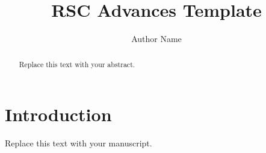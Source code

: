 \documentclass[11pt]{article}
\title{RSC Advances Template}
\author{Author Name}
\date{}
\begin{document}
\maketitle
\begin{abstract}
Replace this text with your abstract.
\end{abstract}

\section{Introduction}
Replace this text with your manuscript.


% 
\end{document}
